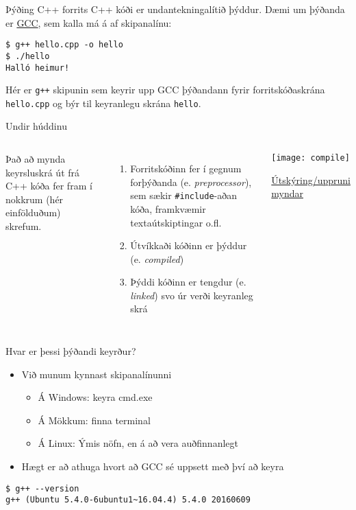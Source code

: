 \documentclass[handout]{beamer}
\begin{document}
\begin{frame}[fragile]{Þýðing C++ forrits}
C++ kóði er undantekningalítið þýddur. Dæmi um þýðanda er \href{https://gcc.gnu.org/}{GCC}, sem kalla má á af skipanalínu:
\begin{verbatim}
$ g++ hello.cpp -o hello
$ ./hello
Halló heimur!
\end{verbatim}
Hér er \texttt{g++} skipunin sem keyrir upp GCC þýðandann fyrir forritskóðaskrána \texttt{hello.cpp} og býr til keyranlegu skrána \texttt{hello}.
\end{frame}

\begin{frame}{Undir húddinu}
\begin{columns}
Það að mynda keyrsluskrá út frá C++ kóða fer fram í nokkrum (hér einfölduðum) skrefum.
\begin{enumerate}
 \item Forritskóðinn fer í gegnum forþýðanda (e. \emph{preprocessor}), sem sækir \texttt{\#include}-aðan kóða, framkvæmir textaútskiptingar o.fl.
 \item Útvíkkaði kóðinn er þýddur (e. \emph{compiled})
 \item Þýddi kóðinn er tengdur (e. \emph{linked}) svo úr verði keyranleg skrá
\end{enumerate}
\begin{center}
\texttt{[image: compile]}

{\tiny \href{http://faculty.cs.niu.edu/~mcmahon/CS241/Notes/compile.html}{Útskýring/uppruni myndar} }
\end{center}
\end{columns}
\end{frame}

\begin{frame}[fragile]{Hvar er þessi þýðandi keyrður?}
\begin{itemize}
 \item Við munum kynnast skipanalínunni
 \begin{itemize}
  \item Á Windows: keyra cmd.exe
  \item Á Mökkum: finna terminal
  \item Á Linux: Ýmis nöfn, en á að vera auðfinnanlegt
 \end{itemize}
 \item Hægt er að athuga hvort að GCC sé uppsett með því að keyra
\end{itemize}
\begin{verbatim}
$ g++ --version
g++ (Ubuntu 5.4.0-6ubuntu1~16.04.4) 5.4.0 20160609
\end{verbatim}

\end{frame}
\end{document}
